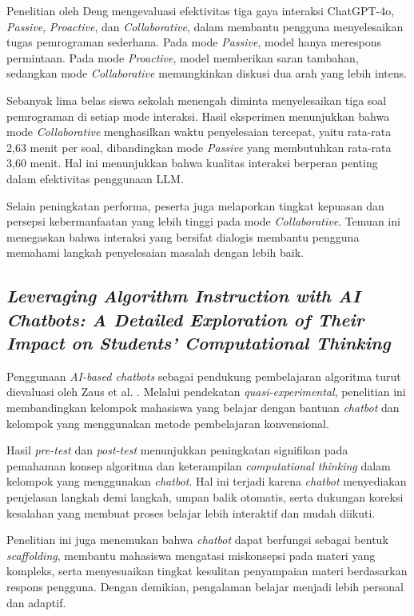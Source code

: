 Penelitian oleh Deng \cite{Deng2025LLMProgrammingTasks} mengevaluasi efektivitas tiga gaya interaksi ChatGPT-4o, \textit{Passive}, \textit{Proactive}, dan \textit{Collaborative}, dalam membantu pengguna menyelesaikan tugas pemrograman sederhana. Pada mode \textit{Passive}, model hanya merespons permintaan. Pada mode \textit{Proactive}, model memberikan saran tambahan, sedangkan mode \textit{Collaborative} memungkinkan diskusi dua arah yang lebih intens.

Sebanyak lima belas siswa sekolah menengah diminta menyelesaikan tiga soal pemrograman di setiap mode interaksi. Hasil eksperimen menunjukkan bahwa mode \textit{Collaborative} menghasilkan waktu penyelesaian tercepat, yaitu rata-rata 2{,}63 menit per soal, dibandingkan mode \textit{Passive} yang membutuhkan rata-rata 3{,}60 menit. Hal ini menunjukkan bahwa kualitas interaksi berperan penting dalam efektivitas penggunaan LLM.

Selain peningkatan performa, peserta juga melaporkan tingkat kepuasan dan persepsi kebermanfaatan yang lebih tinggi pada mode \textit{Collaborative}. Temuan ini menegaskan bahwa interaksi yang bersifat dialogis membantu pengguna memahami langkah penyelesaian masalah dengan lebih baik.


\subsection{\textit{Leveraging Algorithm Instruction with AI Chatbots: A Detailed Exploration of Their Impact on Students' Computational Thinking}}

Penggunaan \textit{AI-based chatbots} sebagai pendukung pembelajaran algoritma turut dievaluasi oleh Zaus et al. \cite{Zaus2025AlgorithmInstructionChatbots}. Melalui pendekatan \textit{quasi-experimental}, penelitian ini membandingkan kelompok mahasiswa yang belajar dengan bantuan \textit{chatbot} dan kelompok yang menggunakan metode pembelajaran konvensional.

Hasil \textit{pre-test} dan \textit{post-test} menunjukkan peningkatan signifikan pada pemahaman konsep algoritma dan keterampilan \textit{computational thinking} dalam kelompok yang menggunakan \textit{chatbot}. Hal ini terjadi karena \textit{chatbot} menyediakan penjelasan langkah demi langkah, umpan balik otomatis, serta dukungan koreksi kesalahan yang membuat proses belajar lebih interaktif dan mudah diikuti.

Penelitian ini juga menemukan bahwa \textit{chatbot} dapat berfungsi sebagai bentuk \textit{scaffolding}, membantu mahasiswa mengatasi miskonsepsi pada materi yang kompleks, serta menyesuaikan tingkat kesulitan penyampaian materi berdasarkan respons pengguna. Dengan demikian, pengalaman belajar menjadi lebih personal dan adaptif.
